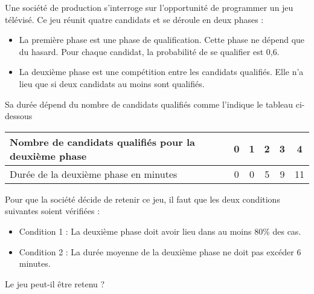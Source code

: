 \documentclass[11pt,fleqn, openany]{book} %
\begin{document}
\begin{exercise}[subtitle={(Centres étrangers 2023)}] Une société de production s'interroge sur l'opportunité de programmer un jeu télévisé.
Ce jeu réunit quatre candidats et se déroule en deux phases :
\begin{itemize}
\item  La première phase est une phase de qualification.
Cette phase ne dépend que du hasard. Pour chaque candidat, la probabilité de se qualifier est 0,6.
\item La deuxième phase est une compétition entre les candidats qualifiés.
Elle n'a lieu que si deux candidats au moins sont qualifiés.\end{itemize}
Sa durée dépend du nombre de candidats qualifiés comme l'indique le tableau ci-dessous
\vspace{-0.3cm}
\begin{center}
\begin{tabular}{|l|c|c|c|c|c|}
\hline
Nombre de candidats qualifiés
pour la deuxième phase & 0 &1& 2& 3&4 \\
\hline
Durée de la deuxième phase en
minutes &0& 0& 5& 9& 11\\
\hline \end{tabular}
\end{center}
\vspace{-0.3cm}
Pour que la société décide de retenir ce jeu, il faut que les deux conditions suivantes soient vérifiées :
\begin{itemize}
\item Condition 1 : La deuxième phase doit avoir lieu dans au moins 80\% des cas.
\item Condition 2 : La durée moyenne de la deuxième phase ne doit pas excéder 6 minutes.\end{itemize}
Le jeu peut-il être retenu ? \end{exercise}
\end{document}
